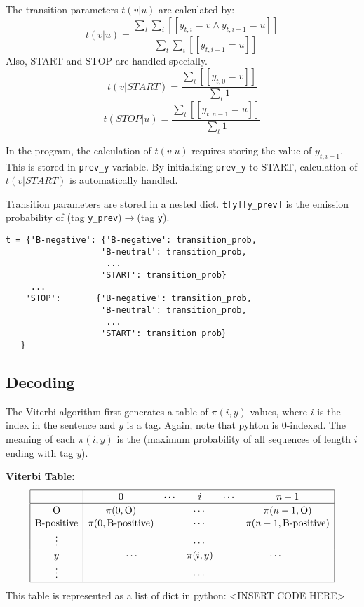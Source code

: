 \documentclass[12pt]{article}
\begin{document}
The transition parameters \(t(v|u)\) are calculated by:
\[ t(v|u) = \frac{\sum_t \sum_i [[y_{t,i}=v \land y_{t,i-1}=u]] }{\sum_{t} \sum_i [[y_{t,i-1}=u]] } \]
Also, START and STOP are handled specially.
\[ t(v|START) = \frac{\sum_t [[y_{t,0}=v]] }{\sum_{t} 1 } \]
\[ t(STOP|u) = \frac{\sum_t [[y_{t,n-1}=u]] }{\sum_{t} 1 } \]

In the program, the calculation of \(t(v|u)\) requires storing the value of \(y_{t,i-1}\). This is stored in \verb|prev_y| variable. By initializing \verb|prev_y| to START, calculation of \(t(v|START)\) is automatically handled.

Transition parameters are stored in a nested dict. \verb|t[y][y_prev]| is the emission probability of (tag \verb|y_prev|)\(\rightarrow\)(tag \verb|y|).

\begin{verbatim}
t = {'B-negative': {'B-negative': transition_prob,
                   'B-neutral': transition_prob,
                    ...
                   'START': transition_prob}
     ...
    'STOP':       {'B-negative': transition_prob,
                   'B-neutral': transition_prob,
                    ...
                   'START': transition_prob}
   }
\end{verbatim}

\subsection{Decoding}

The Viterbi algorithm first generates a table of \(\pi(i,y)\) values, where \(i\) is the index in the sentence and \(y\) is a tag. Again, note that pyhton is 0-indexed. The meaning of each \(\pi(i,y)\) is the (maximum probability of all sequences of length \(i\) ending with tag \(y\)).

\textbf{Viterbi Table:}
\[
\begin{array}{|c|ccccc|}
\hline \rule{0pt}{1em}
& 0 & \cdots & i & \cdots & n-1 \\
\hline \rule{0pt}{1em}
\mbox{O}          & \pi(0,\mbox{O}) & \multicolumn{3}{c}{\cdots} & \pi(n-1,\mbox{O}) \\[0.1em]
\mbox{B-positive} & \pi(0,\mbox{B-positive}) & \multicolumn{3}{c}{\cdots} & \pi(n-1,\mbox{B-positive}) \\[0.1em]
\vdots &          & \multicolumn{3}{c}{\cdots} &            \\[0.1em]
y      & \multicolumn{2}{c}{\cdots} & \pi(i,y) & \multicolumn{2}{c|}{\cdots} \\[0.1em]
\vdots &          & \multicolumn{3}{c}{\cdots} &            \\[0.1em]
\hline
\end{array}
\]
This table is represented as a list of dict in python:
<INSERT CODE HERE>
\end{document}
